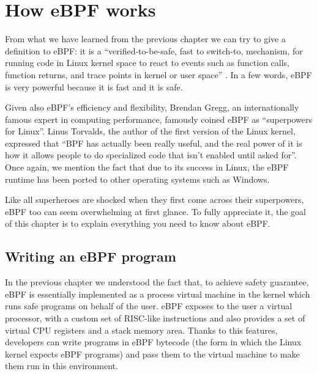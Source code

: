 \chapter{How eBPF works}

From what we have learned from the previous chapter we can try to give a definition to eBPF: it is a ``verified-to-be-safe, fast to switch-to, mechanism, for running code in Linux kernel space to react to events such as function calls, function returns, and trace points in kernel or user space'' \cite{eBPFLinuxJournal}.
In a few words, eBPF is very powerful because it is fast and it is safe. 

Given also eBPF's efficiency and flexibility, Brendan Gregg, an internationally famous expert in computing performance,  famously coined eBPF as ``superpowers for Linux''.
Linus Torvalds, the author of the first version of the Linux kernel, expressed that ``BPF has actually been really useful, and the real power of it is how it allows people to do specialized code that isn't enabled until asked for''.
Once again, we mention the fact that due to its success in Linux, the eBPF runtime has been ported to other operating systems such as Windows.

Like all superheroes are shocked when they first come across their superpowers, eBPF too can seem overwhelming at first glance.
To fully appreciate it, the goal of this chapter is to explain everything you need to know about eBPF.

%
%
%
%
%
%

\section{Writing an eBPF program}

In the previous chapter we understood the fact that, to achieve safety guarantee, eBPF is essentially implemented as a process virtual machine in the kernel which runs safe programs on behalf of the user.
eBPF exposes to the user a virtual processor, with a custom set of RISC-like instructions and also provides a set of virtual CPU registers and a stack memory area.
Thanks to this features, developers can write programs in eBPF bytecode (the form in which the Linux kernel expects eBPF programs) and pass them to the virtual machine to make them run in this environment.

